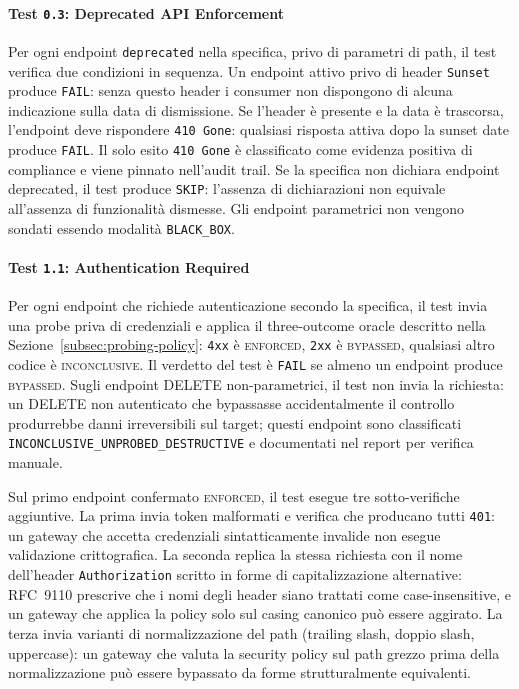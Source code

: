 \paragraph{Test \texttt{0.3}: Deprecated API Enforcement}
Per ogni endpoint \texttt{deprecated} nella specifica, privo di parametri di path, il test verifica due condizioni in sequenza. Un endpoint attivo privo di header \texttt{Sunset} produce \texttt{FAIL}: senza questo header i consumer non dispongono di alcuna indicazione sulla data di dismissione. Se l'header è presente e la data è trascorsa, l'endpoint deve rispondere \texttt{410~Gone}: qualsiasi risposta attiva dopo la sunset date produce \texttt{FAIL}. Il solo esito \texttt{410~Gone} è classificato come evidenza positiva di compliance e viene pinnato nell'audit trail. Se la specifica non dichiara endpoint deprecated, il test produce \texttt{SKIP}: l'assenza di dichiarazioni non equivale all'assenza di funzionalità dismesse. Gli endpoint parametrici non vengono sondati essendo modalità \texttt{BLACK\_BOX}.



\paragraph{Test \texttt{1.1}: Authentication Required}
Per ogni endpoint che richiede autenticazione secondo la specifica, il test invia una probe priva di credenziali e applica il three-outcome oracle descritto nella Sezione~\ref{subsec:probing-policy}: \texttt{4xx} è \textsc{enforced}, \texttt{2xx} è \textsc{bypassed}, qualsiasi altro codice è \textsc{inconclusive}. Il verdetto del test è \texttt{FAIL} se almeno un endpoint produce \textsc{bypassed}. Sugli endpoint DELETE non-parametrici, il test non invia la richiesta: un DELETE non autenticato che bypassasse accidentalmente il controllo produrrebbe danni irreversibili sul target; questi endpoint sono classificati \texttt{INCONCLUSIVE\_UNPROBED\_DESTRUCTIVE} e documentati nel report per verifica manuale.

Sul primo endpoint confermato \textsc{enforced}, il test esegue tre sotto-verifiche aggiuntive. La prima invia token malformati e verifica che producano tutti \texttt{401}: un gateway che accetta credenziali sintatticamente invalide non esegue validazione crittografica. La seconda replica la stessa richiesta con il nome dell'header \texttt{Authorization} scritto in forme di capitalizzazione alternative: RFC~9110 prescrive che i nomi degli header siano trattati come case-insensitive, e un gateway che applica la policy solo sul casing canonico può essere aggirato. La terza invia varianti di normalizzazione del path (trailing slash, doppio slash, uppercase): un gateway che valuta la security policy sul path grezzo prima della normalizzazione può essere bypassato da forme strutturalmente equivalenti.



